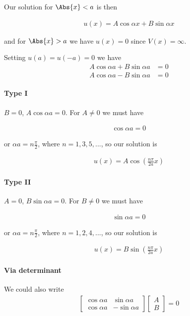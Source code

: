 Our solution for $\Abs{x} < a$ is then

\begin{align}\label{eqn:PHY356Lecture9:8}
u(x) = A \cos \alpha x + B \sin\alpha x
\end{align}

and for $\Abs{x} > a$ we have $u(x) = 0$ since $V(x) = \infty$.

Setting $u(a) = u(-a) = 0$ we have
\begin{align*}
A \cos \alpha a + B \sin\alpha a &= 0 \\
A \cos \alpha a - B \sin\alpha a &= 0
\end{align*}


\paragraph{Type I}
$B=0$, $A \cos\alpha a = 0$.  For $A \ne 0$ we must have

\begin{align*}
\cos \alpha a = 0
\end{align*}

or $\alpha a = n \frac{\pi}{2}$, where $n = 1, 3, 5, ...$, so our solution is

\begin{align}\label{eqn:PHY356Lecture9:9}
u(x) = A \cos \left( \frac{n \pi}{2 a} x \right)
\end{align}

\paragraph{Type II}
$A=0$, $B \sin\alpha a = 0$.  For $B \ne 0$ we must have

\begin{align*}
\sin \alpha a = 0
\end{align*}

or $\alpha a = n \frac{\pi}{2}$, where $n = 1, 2, 4, ...$, so our solution is

\begin{align}\label{eqn:PHY356Lecture9:10}
u(x) = B \sin \left( \frac{n \pi}{2 a} x \right)
\end{align}

\paragraph{Via determinant}

We could also write
\begin{align*}
\begin{bmatrix}
\cos \alpha a & \sin\alpha a \\
\cos \alpha a & - \sin\alpha a
\end{bmatrix}
\begin{bmatrix}
A \\
B
\end{bmatrix}
= 0
\end{align*}

